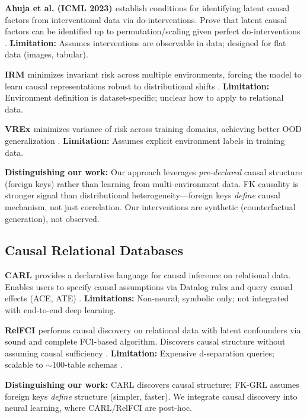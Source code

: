 \documentclass[11pt,letterpaper]{article}
\begin{document}
\textbf{Ahuja et al. (ICML 2023) \cite{Ahuja2023}} establish conditions for identifying latent causal factors from interventional data via do-interventions. Prove that latent causal factors can be identified up to permutation/scaling given perfect do-interventions \cite{Ahuja2023}. \textbf{Limitation:} Assumes interventions are observable in data; designed for flat data (images, tabular).

\textbf{IRM \cite{Arjovsky2019}} minimizes invariant risk across multiple environments, forcing the model to learn causal representations robust to distributional shifts \cite{Arjovsky2019}. \textbf{Limitation:} Environment definition is dataset-specific; unclear how to apply to relational data.

\textbf{VREx \cite{Krueger2021}} minimizes variance of risk across training domains, achieving better OOD generalization \cite{Krueger2021}. \textbf{Limitation:} Assumes explicit environment labels in training data.

\textbf{Distinguishing our work:} Our approach leverages \textit{pre-declared} causal structure (foreign keys) rather than learning from multi-environment data. FK causality is stronger signal than distributional heterogeneity---foreign keys \textit{define} causal mechanism, not just correlation. Our interventions are synthetic (counterfactual generation), not observed.

\subsection{Causal Relational Databases}

\textbf{CARL \cite{Salimi2020}} provides a declarative language for causal inference on relational data. Enables users to specify causal assumptions via Datalog rules and query causal effects (ACE, ATE) \cite{Salimi2020}. \textbf{Limitations:} Non-neural; symbolic only; not integrated with end-to-end deep learning.

\textbf{RelFCI \cite{Negro2025}} performs causal discovery on relational data with latent confounders via sound and complete FCI-based algorithm. Discovers causal structure without assuming causal sufficiency \cite{Negro2025}. \textbf{Limitation:} Expensive d-separation queries; scalable to $\sim$100-table schemas \cite{Negro2025}.

\textbf{Distinguishing our work:} CARL discovers causal structure; FK-GRL assumes foreign keys \textit{define} structure (simpler, faster). We integrate causal discovery into neural learning, where CARL/RelFCI are post-hoc.
\end{document}
